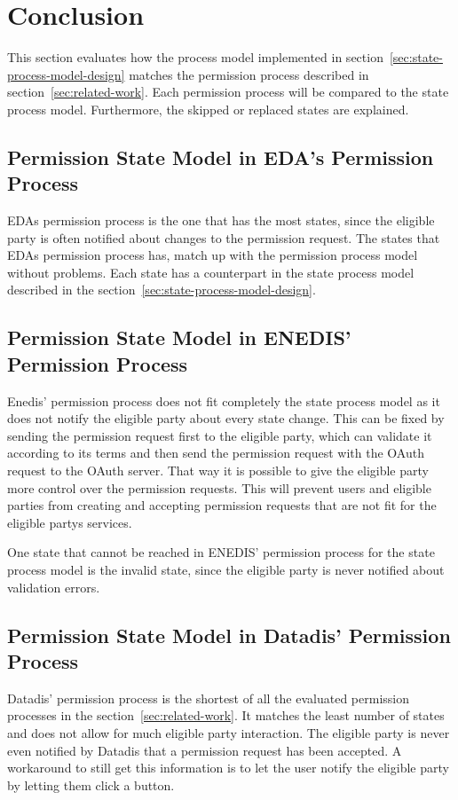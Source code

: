 \section{Conclusion}\label{sec:conclusion}
This section evaluates how the process model implemented in section\ \ref{sec:state-process-model-design} matches the permission process described in section\ \ref{sec:related-work}.
Each permission process will be compared to the state process model.
Furthermore, the skipped or replaced states are explained.

\subsection{Permission State Model in EDA's Permission Process}\label{subsec:permission-state-model-in-eda's-permission-process}
EDAs permission process is the one that has the most states, since the eligible party is often notified about changes to the permission request.
The states that EDAs permission process has, match up with the permission process model without problems.
Each state has a counterpart in the state process model described in the section\ \ref{sec:state-process-model-design}.

\subsection{Permission State Model in ENEDIS' Permission Process}\label{subsec:permission-state-model-in-enedis'-permission-process}
Enedis' permission process does not fit completely the state process model as it does not notify the eligible party about every state change.
This can be fixed by sending the permission request first to the eligible party, which can validate it according to its terms and then send the permission request with the OAuth request to the OAuth server.
That way it is possible to give the eligible party more control over the permission requests.
This will prevent users and eligible parties from creating and accepting permission requests that are not fit for the eligible partys services.

One state that cannot be reached in ENEDIS' permission process for the state process model is the invalid state, since the eligible party is never notified about validation errors.


\subsection{Permission State Model in Datadis' Permission Process}\label{subsec:permission-state-model-in-datadis'-permission-process}
Datadis' permission process is the shortest of all the evaluated permission processes in the section\ \ref{sec:related-work}.
It matches the least number of states and does not allow for much eligible party interaction.
The eligible party is never even notified by Datadis that a permission request has been accepted.
A workaround to still get this information is to let the user notify the eligible party by letting them click a button.

